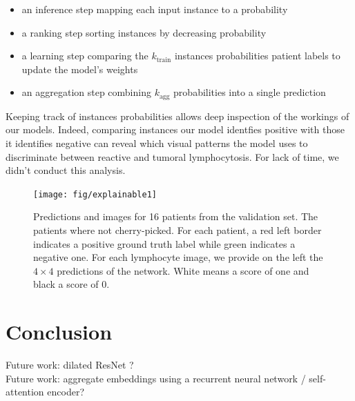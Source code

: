 \documentclass[final]{cvpr}
\begin{document}
	\begin{itemize}
		\itemsep-0.1em
		\item an inference step mapping each input instance to a probability
		\item a ranking step sorting instances by decreasing probability
		\item a learning step comparing the $k_{\text{train}}$ instances probabilities patient labels to update the model’s weights
		\item an aggregation step combining $k_{\text{agg}}$ probabilities into a single prediction
	\end{itemize}
	
	\noindent
	Keeping track of instances probabilities allows deep inspection of the workings of our models. Indeed, comparing instances our model identfies positive with those it identifies negative can reveal which visual patterns the model uses to discriminate between reactive and tumoral lymphocytosis. For lack of time, we didn't conduct this analysis.
	
	\begin{figure}[t]
		\begin{center}
			\texttt{[image: fig/explainable1]}
		\end{center}
		\caption{Predictions and images for 16 patients from the validation set. The patients where not cherry-picked. For each patient, a red left border indicates a positive ground truth label while green indicates a negative one. For each lymphocyte image, we provide on the left the $4\times 4$ predictions of the network. White means a score of one and black a score of 0.}
		\label{fig:explaina}
	\end{figure}
	
	\section{Conclusion}
	Future work: dilated ResNet ?\\
	Future work: aggregate embeddings using a recurrent neural network / self-attention encoder?
	
	{\small
		
		
	}
\end{document}

